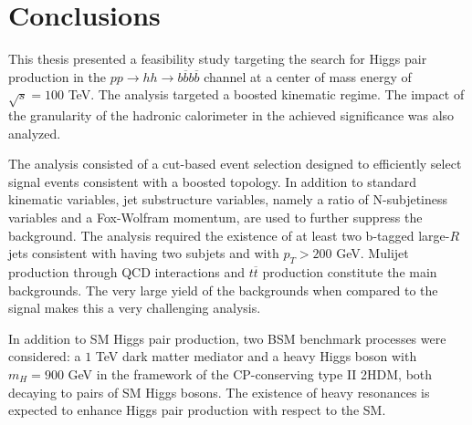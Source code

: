 
\chapter{Conclusions}
\label{chapter:conclusions}

This thesis presented a feasibility study targeting the search for Higgs pair production in the $pp\rightarrow hh\rightarrow b\overline{b}b\overline{b}$ channel at a center of mass energy of $\sqrt{s}=100$ TeV. The analysis targeted a boosted kinematic regime. The impact of the granularity of the hadronic calorimeter in the achieved significance was also analyzed.

The analysis consisted of a cut-based event selection designed to efficiently select signal events consistent with a boosted topology. In addition to standard kinematic variables, jet substructure variables, namely a ratio of N-subjetiness variables and a Fox-Wolfram momentum, are used to further suppress the background. The analysis required the existence of at least two b-tagged large-$R$ jets consistent with having two subjets and with $p_T>200$ GeV. Mulijet production through QCD interactions and $t\overline{t}$ production constitute the main backgrounds. The very large yield of the backgrounds when compared to the signal makes this a very challenging analysis.

In addition to SM Higgs pair production, two BSM benchmark processes were considered: a $1$ TeV dark matter mediator and a heavy Higgs boson with $m_H=900$ GeV in the framework of the CP-conserving type II 2HDM, both decaying to pairs of SM Higgs bosons. The existence of heavy resonances is expected to enhance Higgs pair production with respect to the SM.

